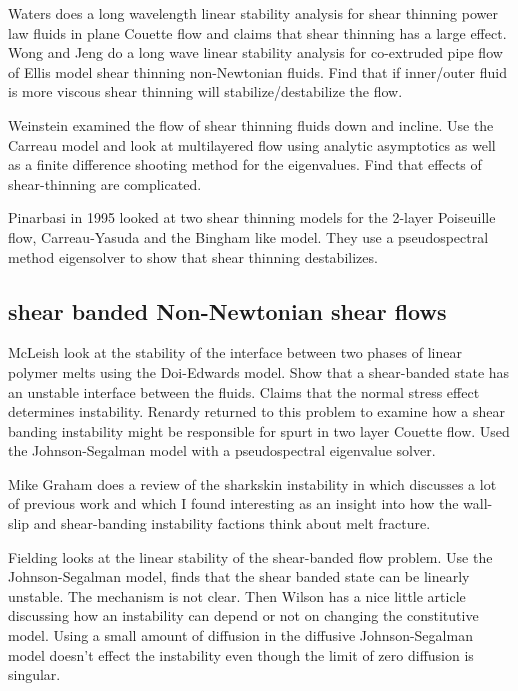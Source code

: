 \documentclass{jfm}
\begin{document}
Waters \citep{Waters1983} does a long wavelength linear stability analysis for
shear thinning power law fluids in plane Couette flow and claims that shear
thinning has a large effect. Wong and Jeng \citep{Wong1987} do a long wave
linear stability analysis for co-extruded pipe flow of Ellis model shear
thinning non-Newtonian fluids. Find that if inner/outer fluid is more viscous
shear thinning will stabilize/destabilize the flow.

Weinstein \citep{Weinstein1990} examined the flow of shear thinning fluids down
and incline. Use the Carreau model and look at multilayered flow using analytic
asymptotics as well as a finite difference shooting method for the eigenvalues.
Find that effects of shear-thinning are complicated.

Pinarbasi \citep{Pinarbasi1995} in 1995 looked at two shear thinning models for
the 2-layer Poiseuille flow, Carreau-Yasuda and the Bingham like model. They
use a pseudospectral method eigensolver to show that shear thinning
destabilizes. 

\subsection{shear banded Non-Newtonian shear flows}

McLeish \citep{McLeish1987} look at the stability of the interface between two
phases of linear polymer melts using the Doi-Edwards model. Show that a
shear-banded state has an unstable interface between the fluids. Claims that
the normal stress effect determines instability. Renardy \citep{Renardy1995a}
returned to this problem to examine how a shear banding instability might be
responsible for spurt in two layer Couette flow.  Used the Johnson-Segalman
model with a pseudospectral eigenvalue solver. 

Mike Graham does a review of the sharkskin instability in \citep{Graham1999}
which discusses a lot of previous work and which I found interesting as an
insight into how the wall-slip and shear-banding instability factions think
about melt fracture.

Fielding \citep{Fielding2005} looks at the linear stability of the shear-banded
flow problem. Use the Johnson-Segalman model, finds that the shear banded state
can be linearly unstable. The mechanism is not clear. Then Wilson
\citep{Wilson2006} has a nice little article discussing how an instability can
depend or not on changing the constitutive model. Using a small amount of
diffusion in the diffusive Johnson-Segalman model doesn't effect the
instability even though the limit of zero diffusion is singular.
\end{document}
